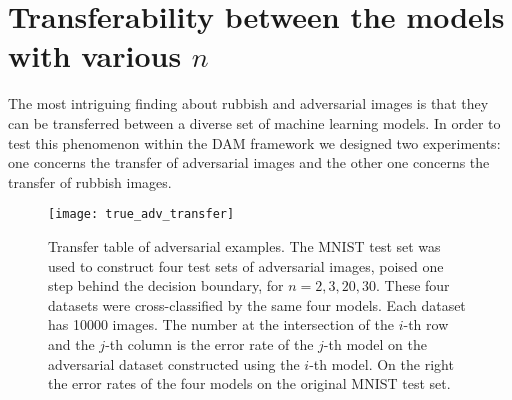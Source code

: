 \documentclass[12pt]{article} %
\begin{document}
\section{Transferability between the models with various $n$}
The most intriguing finding about rubbish and adversarial images is that they can be transferred between a diverse set of machine learning models. In order to test this phenomenon within the DAM framework we designed two experiments: one concerns the transfer of adversarial images and the other one concerns the transfer of rubbish images. 
\begin{figure}[t]
\begin{center}
\texttt{[image: true\_adv\_transfer]}
\end{center}
\caption{\footnotesize{Transfer table of adversarial examples. The MNIST test set was used to construct four test sets of adversarial images, poised one step behind the decision boundary, for $n=2, 3, 20, 30$. These four datasets were  cross-classified by the same four models. Each dataset has 10000 images. The number at the intersection of the $i$-th row and the $j$-th column is the error rate of the $j$-th model on the adversarial dataset constructed using the $i$-th model. On the right the error rates of the four models on the original MNIST test set.}}\label{true_adv_transfer}
\end{figure}
\end{document}
